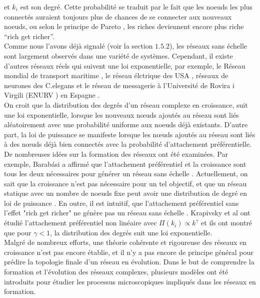 et $k_i$ est son degré.
Cette probabilité se traduit par le fait que les noeuds les plus connectés auraient
toujours plus de chances de se connecter aux nouveaux noeuds, ou selon le principe de Pareto \cite{Pareto1897}, les riches 
deviennent encore plus riche ``rich get richer''.\\
Comme nous l'avons déjà signalé (voir la section $1.5.2$), les réseaux sans échelle sont largement 
observés dans une variété de systèmes. Cependant, il existe d'autres réseaux réels
qui suivent une loi exponentielle, par exemple, le Réseau mondial de transport maritime 
\cite{ Deng-al2009}, le réseau élctrique des USA \cite{Albert-al2004}, réseaux de neurones
des C.elegans \cite{Achacoso-Yamamoto1992} et le réseau de messagerie à
l'Université de Rovira i Virgili (ENURV ) en Espagne \cite{Albert-al2004}.\\
On croit que la distribution des degrés d'un réseau complexe en croissance, suit 
une loi exponentielle, lorsque les nouveaux nœuds ajoutés au réseau sont liés aléatoirement avec une probabilité uniforme
aux noeuds déjà existants. D'autre part, la loi de puissance se manifeste lorsque les nœuds 
ajoutés au réseau sont liés à des nœuds déjà bien connectés avec la probabilité d'attachement préférentielle.\\
De nombreuses idées sur la formation des réseaux ont été examinées. Par exemple, Barab\'{a}si 
a affirmé que l'attachement préférentiel et la croissance sont tous les deux nécessaires  pour générer un réseau sans échelle \cite{BA-al1999}. Actuellement, on sait que la croissance n'est pas
nécessaire pour un tel objectif, et que un réseau statique avec un nombre de noeuds fixe peut 
avoir une distribution de degré en loi de puissance \cite{Xie-al2008}.
En outre, il est intuitif, que l'attachement préférentiel 
sans l'effet "rich get richer" ne génère pas un réseau sans échelle \cite{Samalam}.
Krapivsky et al \cite{Krapivsky-al2000} ont étudié l'attachement préférentiel non linéaire
avec $\Pi(k_i)\varpropto k^{\gamma}$ et ils ont montré que pour $\gamma<1$, la distribution des degrés suit une loi
exponentielle.\\
Malgré de nombreux efforts, une théorie cohérente et rigoureuse des réseaux en croissance n'est pas encore établie, et 
il n'y a pas encore de principe général pour prédire la topologie finale d'un réseau en évolution. Dans le but de comprendre 
la  formation  et l'évolution des réseaux complexes, plusieurs modèles ont été introduits pour étudier les processus
microscopiques impliqués dans les réseaux en formation. %
